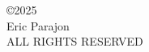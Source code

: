 
\begin{center}
\begin{singlespace}
\copyright 2025\\
Eric Parajon\\
ALL RIGHTS RESERVED
\end{singlespace}
\vspace*{52pt}
\end{center}

\clearpage
